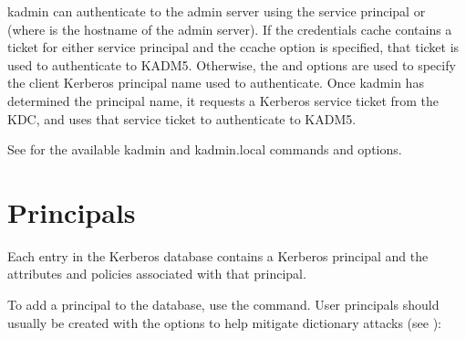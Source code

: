\documentclass[letterpaper,10pt,english]{sphinxmanual}
\begin{document}
\sphinxAtStartPar
kadmin can authenticate to the admin server using the service
principal  or  (where  is the
hostname of the admin server).  If the credentials cache contains a
ticket for either service principal and the  ccache option is
specified, that ticket is used to authenticate to KADM5.  Otherwise,
the  and  options are used to specify the client Kerberos
principal name used to authenticate.  Once kadmin has determined the
principal name, it requests a  Kerberos service ticket
from the KDC, and uses that service ticket to authenticate to KADM5.

\sphinxAtStartPar
See {\hyperref[\detokenize{admin/admin_commands/kadmin_local:kadmin-1}]{}} for the available kadmin and kadmin.local
commands and options.


\section{Principals}
\label{\detokenize{admin/database:principals}}\label{\detokenize{admin/database:id1}}
\sphinxAtStartPar
Each entry in the Kerberos database contains a Kerberos principal and
the attributes and policies associated with that principal.

\sphinxAtStartPar
To add a principal to the database, use the {\hyperref[\detokenize{admin/admin_commands/kadmin_local:kadmin-1}]{}}
 command.  User principals should usually be created
with the  options to help mitigate
dictionary attacks (see {\hyperref[\detokenize{admin/dictionary:dictionary}]{}}):

\begin{sphinxVerbatim}[commandchars=\\\{\}]
    
    
    
\end{sphinxVerbatim}
\end{document}
